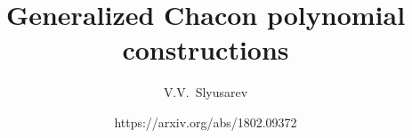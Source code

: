 

\title[Chacon polynomials] %
{Generalized Chacon polynomial constructions}


\author%
{V.V.~Slyusarev}


\date[ 25.11.2017] %
{\normalsize https://arxiv.org/abs/1802.09372}

\subject{https://arxiv.org/abs/1802.09372}

